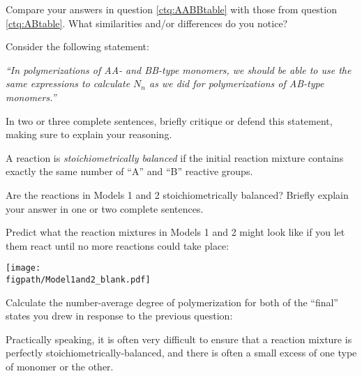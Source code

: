 \begin{activity}
\begin{ctqs}
		\question Compare your answers in question \ref{ctq:AABBtable} with those from question \ref{ctq:ABtable}.  What similarities and/or differences do you notice?
		
		\vspace{1in}
		
		\question Consider the following statement:
		
			\emph{``In polymerizations of AA- and BB-type monomers, we should be able to use the same expressions to calculate $N_n$ as we did for polymerizations of AB-type monomers.''}
			
			In two or three complete sentences, briefly critique or defend this statement, making sure to explain your reasoning.
		
		\vspace{1.5in}
			
\end{ctqs}
	
\begin{infobox}

A reaction is \emph{stoichiometrically balanced} if the initial reaction mixture contains exactly the same number of ``A'' and ``B'' reactive groups.

\end{infobox}
	
\begin{ctqs}
		\question Are the reactions in Models 1 and 2 stoichiometrically balanced?  Briefly explain your answer in one or two complete sentences.
		
		\vspace{1in}
		
		\question Predict what the reaction mixtures in Models 1 and 2 might look like if you let them react until no more reactions could take place:
		
\vspace{0.1in}
\centerline{\texttt{[image: \\figpath/Model1and2\_blank.pdf]}}
		
		\question Calculate the number-average degree of polymerization for both of the ``final'' states you drew in response to the previous question:
		
		\vspace{1in}
\end{ctqs}

\begin{model}

Practically speaking, it is often very difficult to ensure that a reaction mixture is perfectly stoichiometrically-balanced, and there is often a small excess of one type of monomer or the other.


\end{model}
\end{activity}
